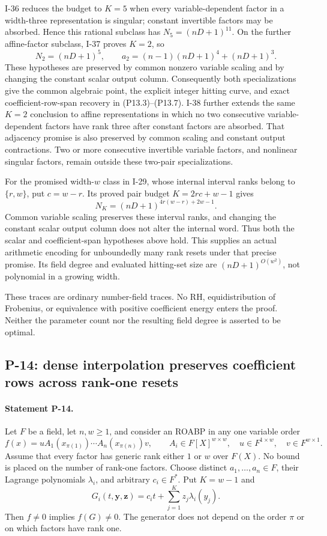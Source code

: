 I-36 reduces the budget to $K=5$ when every variable-dependent
factor in a width-three representation is singular; constant
invertible factors may be absorbed. Hence this rational subclass
has $N_5=(nD+1)^{11}$. On the further affine-factor subclass,
I-37 proves $K=2$, so
\[
 N_2=(nD+1)^5,\qquad
 a_2=(n-1)(nD+1)^4+(nD+1)^3.
\]
These hypotheses are preserved by common nonzero variable scaling
and by changing the constant scalar output column. Consequently
both specializations give the common algebraic point, the explicit
integer hitting curve, and exact coefficient-row-span recovery in
(P13.3)--(P13.7). I-38 further extends the same $K=2$ conclusion to affine
representations in which no two consecutive variable-dependent
factors have rank three after constant factors are absorbed.
That adjacency promise is also preserved by common scaling and
constant output contractions. Two or more consecutive invertible
variable factors, and nonlinear singular factors, remain outside
these two-pair specializations.

For the promised width-$w$ class in I-29, whose internal interval
ranks belong to $\{r,w\}$, put $c=w-r$. Its proved pair budget
$K=2rc+w-1$ gives
\[
 N_K=(nD+1)^{4r(w-r)+2w-1}.
\]
Common variable scaling preserves these interval ranks, and
changing the constant scalar output column does not alter the
internal word. Thus both the scalar and coefficient-span
hypotheses above hold. This supplies an actual arithmetic
encoding for unboundedly many rank resets under that precise
promise. Its field degree and evaluated hitting-set size are
$(nD+1)^{O(w^2)}$, not polynomial in a growing width.

These traces are ordinary number-field traces. No RH,
equidistribution of Frobenius, or equivalence with positive coefficient
energy enters the proof. Neither the parameter count nor
the resulting field degree is asserted to be optimal.

\subsection{P-14: dense interpolation preserves coefficient rows across rank-one resets}
\paragraph{Statement P-14.}
Let $F$ be a field, let $n,w\geq1$, and consider an ROABP in any
one variable order
\[
 f(x)=uA_1(x_{\pi(1)})\cdots A_n(x_{\pi(n)})v,
 \qquad A_i\in F[X]^{w\times w},\quad
 u\in F^{1\times w},\quad v\in F^{w\times1}.
 \tag{P14.1}
\]
Assume that every factor has generic rank either $1$ or $w$ over
$F(X)$. No bound is placed on the number of rank-one factors.
Choose distinct $a_1,\ldots,a_n\in F$, their Lagrange polynomials
$\lambda_i$, and arbitrary $c_i\in F^*$. Put $K=w-1$ and
\[
 G_i(t,\mathbf y,\mathbf z)
       =c_it+\sum_{j=1}^{K}z_j\lambda_i(y_j).
 \tag{P14.2}
\]
Then $f\ne0$ implies $f(G)\ne0$. The generator does not depend
on the order $\pi$ or on which factors have rank one.

